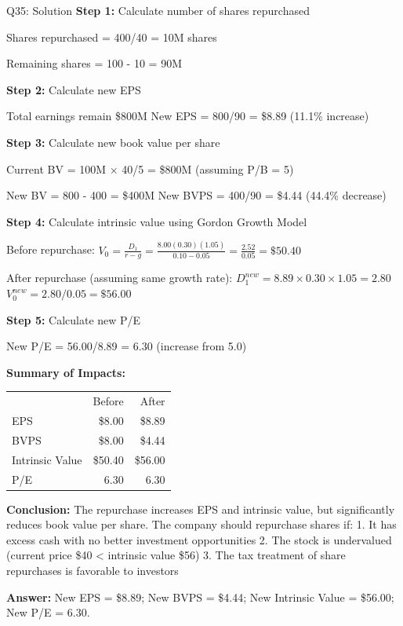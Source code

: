 \documentclass{beamer}
\renewcommand{\scriptsize}{\fontsize{6pt}{7pt}\selectfont}
\begin{document}
	\begin{frame}{Q35: Solution}
		\scriptsize
		\textbf{Step 1:} Calculate number of shares repurchased
		
		Shares repurchased = 400/40 = 10M shares
		
		Remaining shares = 100 - 10 = 90M
		
		\vspace{2pt}
		\textbf{Step 2:} Calculate new EPS
		
		Total earnings remain \$800M
		New EPS = 800/90 = \$8.89 (11.1\% increase)
		
		\vspace{2pt}
		\textbf{Step 3:} Calculate new book value per share
		
		Current BV = 100M × 40/5 = \$800M (assuming P/B = 5)
		
		New BV = 800 - 400 = \$400M
		New BVPS = 400/90 = \$4.44 (44.4\% decrease)
		
		\vspace{2pt}
		\textbf{Step 4:} Calculate intrinsic value using Gordon Growth Model
		
		Before repurchase:
		$V_0 = \frac{D_1}{r-g} = \frac{8.00(0.30)(1.05)}{0.10 - 0.05} = \frac{2.52}{0.05} = \$50.40$
		
		After repurchase (assuming same growth rate):
		$D_1^{new} = 8.89 \times 0.30 \times 1.05 = 2.80$
		$V_0^{new} = 2.80/0.05 = \$56.00$
		
		\vspace{2pt}
		\textbf{Step 5:} Calculate new P/E
		
		New P/E = 56.00/8.89 = 6.30 (increase from 5.0)
		
		\vspace{2pt}
		\textbf{Summary of Impacts:}
		
		\begin{tabular}{lrr}
			& Before & After \\
			EPS & \$8.00 & \$8.89 \\
			BVPS & \$8.00 & \$4.44 \\
			Intrinsic Value & \$50.40 & \$56.00 \\
			P/E & 6.30 & 6.30 \\
		\end{tabular}
		
		\vspace{2pt}
		\textbf{Conclusion:} The repurchase increases EPS and intrinsic value, but significantly reduces book value per share. The company should repurchase shares if:
		1. It has excess cash with no better investment opportunities
		2. The stock is undervalued (current price \$40 < intrinsic value \$56)
		3. The tax treatment of share repurchases is favorable to investors
		
		\textbf{Answer:} New EPS = \$8.89; New BVPS = \$4.44; New Intrinsic Value = \$56.00; New P/E = 6.30.
	\end{frame}
	
\end{document}
